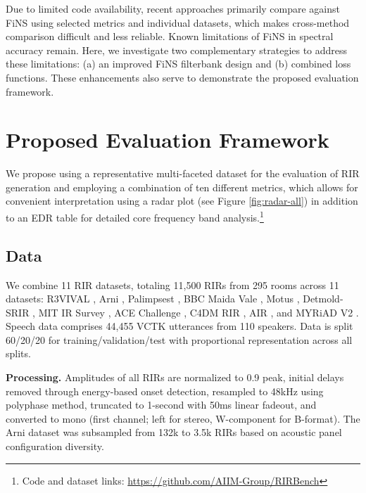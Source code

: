 \documentclass[conference]{IEEEtran}
\begin{document}
Due to limited code availability, recent approaches primarily compare against FiNS using selected metrics and individual datasets, which makes cross-method comparison difficult and less reliable. Known limitations of FiNS in spectral accuracy remain. Here, we investigate two complementary strategies to address these limitations: (a) an improved FiNS filterbank design and (b) combined loss functions. These enhancements also serve to demonstrate the proposed evaluation framework.
 
\section{Proposed Evaluation Framework} 
 

We propose using a representative multi-faceted dataset for the evaluation of RIR generation and employing a combination of ten different metrics, which allows for convenient interpretation using a radar plot (see Figure \ref{fig:radar-all}) in addition to an EDR table for detailed core frequency band analysis.\footnote{Code and dataset links: \url{https://github.com/AIIM-Group/RIRBench}}
 
\subsection{Data}
We combine 11 RIR datasets, totaling 11,500 RIRs from 295 rooms across 11 datasets: R3VIVAL \cite{klein2023r3vival}, Arni \cite{Prawda2022ArniDataset}, Palimpsest \cite{pasoulas2022palimpa}, BBC Maida Vale \cite{kearney2022BBC}, Motus \cite{Gotz2021MotusDatasetPaper}, Detmold-SRIR \cite{amengual2020Detmold}, MIT IR Survey \cite{traer2016MIT}, ACE Challenge \cite{eaton2016estimationACE}, C4DM RIR \cite{stewart2010c4dm}, AIR \cite{murphy2010openair}, and MYRiAD V2 \cite{dietzen2023myriad}. Speech data comprises 44,455 VCTK \cite{yamagishi2019vctk} utterances from 110 speakers. Data is split 60/20/20 for training/validation/test with proportional representation across all splits.
 
\textbf{Processing.} Amplitudes of all RIRs are normalized to 0.9 peak, initial delays removed through energy-based onset detection, resampled to 48kHz using polyphase method, truncated to 1-second with 50ms linear fadeout, and converted to mono (first channel; left for stereo, W-component for B-format). The Arni dataset was subsampled from 132k to 3.5k RIRs based on acoustic panel configuration diversity.
 
\end{document}
